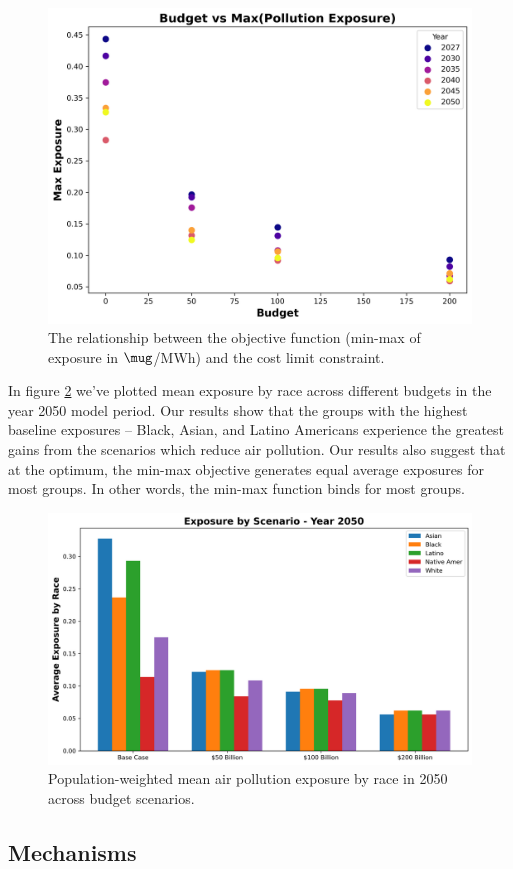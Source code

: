 \documentclass[a4paper]{article}
\theoremstyle{definition}
\theoremstyle{plain}
\begin{document}
\begin{figure}
    \centering
    \includegraphics[width=0.7\linewidth]{Figures/EndogenousPaper/exposure_cost_PPF.png}
    \caption{The relationship between the objective function (min-max of exposure in $\mug$/MWh) and the cost limit constraint.}
    \label{PPF}
\end{figure}

In figure \ref{ExposureByRace} we've plotted mean exposure by race across different budgets in the year 2050 model period. Our results show that the groups with the highest baseline exposures -- Black, Asian, and Latino Americans experience the greatest gains from the scenarios which reduce air pollution. Our results also suggest that at the optimum, the min-max objective generates equal average exposures for most groups. In other words, the min-max function binds for most groups.

\begin{figure}
    \centering
    \includegraphics[width=0.5\linewidth]{Figures/EndogenousPaper/exposure_by_scenario_2050.png}
    \caption{Population-weighted mean air pollution exposure by race in 2050 across budget scenarios.}
    \label{ExposureByRace}
\end{figure}

\subsection{Mechanisms}
\end{document}
